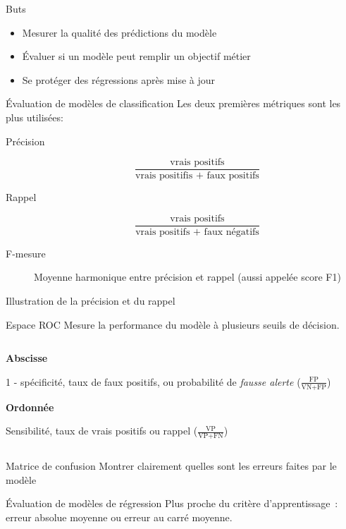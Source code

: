 \begin{frame}{Buts}
  \begin{itemize}[<+->]
    \item Mesurer la qualité des prédictions du modèle
    \item Évaluer si un modèle peut remplir un objectif métier
    \item Se protéger des régressions après mise à jour
  \end{itemize}
\end{frame}

\begin{frame}{Évaluation de modèles de classification}
  Les deux premières métriques sont les plus utilisées:
  \begin{description}
  \item[Précision]
    \[
    \frac{\text{vrais positifs}}{\text{vrais positifis + faux positifs}}
    \]
  \item[Rappel]
    \[
    \frac{\text{vrais positifs}}{\text{vrais positifs + faux négatifs}}
  \]
  \item[F-mesure] Moyenne harmonique entre précision et rappel (aussi appelée score F1)
  \end{description}
\end{frame}

\begin{frame}{Illustration de la précision et du rappel}
\end{frame}

\begin{frame}{Espace ROC}
  Mesure la performance du modèle à plusieurs seuils de décision.
  \begin{columns}
    \begin{column}{.48\textwidth}
      \textbf{Abscisse}

      1 - spécificité, taux de faux positifs, ou probabilité de \emph{fausse alerte} ($\frac{\text{FP}}{\text{VN} + \text{FP}}$)
 
      \vspace{1cm}
      \textbf{Ordonnée}
  
      Sensibilité, taux de vrais positifs ou rappel ($\frac{\text{VP}}{\text{VP} + \text{FN}}$)
    \end{column}
    \begin{column}{.52\textwidth}
    \end{column}
  \end{columns}
\end{frame}

\begin{frame}{Matrice de confusion}
  Montrer clairement quelles sont les erreurs faites par le modèle
\end{frame}

\begin{frame}{Évaluation de modèles de régression}
  Plus proche du critère d'apprentissage~: erreur absolue moyenne ou erreur au carré moyenne.
\end{frame}
